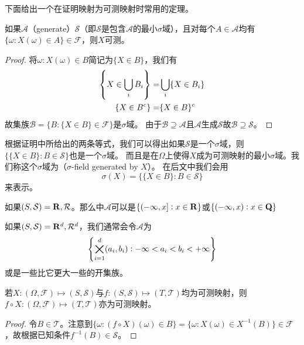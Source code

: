 \documentclass[../main.tex]{subfiles}
\begin{document}
下面给出一个在证明映射为可测映射时常用的定理。
\begin{theorem}\label{thm:1.3.1}
	如果\(\mathcal{A}\)（generate）\(\mathcal{S}\)（即\(\mathcal{S}\)是包含\(\mathcal{A}\)的最小\(\sigma\)域），且对每个\(A\in \mathcal{A}\)均有\(\{\omega:X(\omega)\in A\}\in\mathcal{F}\)，则\(X\)可测。
\end{theorem}
\begin{proof}
	将\(\omega: X(\omega)\in B\)简记为\(\{X\in B\}\)，我们有
	\begin{align*}
		\cbr{X\in\bigcup_i B_i}=&\bigcup_{i}\{X\in B_i\}\\
		\{X\in B^c\}=&\{X\in B\}^c
	\end{align*}
	故集族\(\mathcal{B}=\{B:\{X\in B\}\in\mathcal{F}\}\)是\(\sigma\)域。
	由于\(\mathcal{B}\supseteq \mathcal{A}\)且\(\mathcal{A}\)生成\(\mathcal{S}\)故\(\mathcal{B}\supseteq\mathcal{S}\)。
\end{proof}

根据证明中所给出的两条等式，我们可以得出如果\(\mathcal{S}\)是一个\(\sigma\)域，则\(\{\{X\in B\}:B\in\mathcal{S}\}\)也是一个\(\sigma\)域。
而且是在\(\Omega\)上使得\(X\)成为可测映射的最小\(\sigma\)域。我们称这个\(\sigma\)域为（\(\sigma\)-field generated by \(X\)）。
在后文中我们会用
\begin{equation}
	\sigma(X)=\{\{X\in B\}:B\in\mathcal{S}\}
\end{equation}
来表示。

\begin{example}\label{ex:1.3.2}
	如果\((S,\mathcal{S})=\mathbf{R},\mathcal{R}\)。那么中\(\mathcal{A}\)可以是\(\{\intoc{-\infty,x}:x\in\R\}\)或\(\{\intoo{-\infty,x}:x\in\Q\}\)
\end{example}

\begin{example}
	如果\((S,\mathcal{S})=\mathbf{R}^d,\mathcal{R}^d\)，我们通常会令\(\mathcal{A}\)为
	\[\cbr{\bigtimes_{i=1}^d(a_i,b_i):-\infty<a_i<b_i<+\infty}\]
	或是一些比它更大一些的开集族。
\end{example}

\begin{theorem}\label{thm:1.3.4}
	若\(X:(\Omega,\mathcal{F})\mapsto(S,\mathcal{S})\)与\(f:(S,\mathcal{S})\mapsto(T,\mathcal{T})\)均为可测映射，则\(f\circ X:(\Omega,\mathcal{F})\mapsto(T,\mathcal{T})\)亦为可测映射。
\end{theorem}
\begin{proof}
	令\(B\in\mathcal{T}\)。注意到\(\{\omega:(f\circ X)(\omega)\in B\}=\{\omega:X(\omega)\in X^{-1}(B)\}\in\mathcal{F}\)，故根据已知条件\(f^{-1}(B)\in\mathcal{S}\)。
\end{proof}
\end{document}
